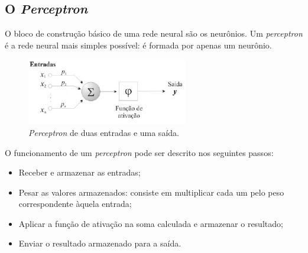%

\subsection{O \textit{Perceptron}}

O bloco de construção básico de uma rede neural são os neurônios. Um \textit{perceptron} é a rede
neural mais simples possível: é formada por apenas um neurônio.

\begin{figure}[ht]
\centering
\includegraphics[width=7cm]{figuras/rede_neural_neuronio}
\caption{\textit{Perceptron} de duas entradas e uma saída.}\label{fig:rede_neural_perceptron}
\end{figure}


O funcionamento de um \textit{perceptron} pode ser descrito nos seguintes passos:

\begin{itemize}
\item
  Receber e armazenar as entradas;
\item
  Pesar as valores armazenados: consiste em multiplicar cada um pelo peso correspondente àquela entrada;
\item
  Aplicar a função de ativação na soma calculada e armazenar o resultado;
\item
  Enviar o resultado armazenado para a saída.
\end{itemize}

